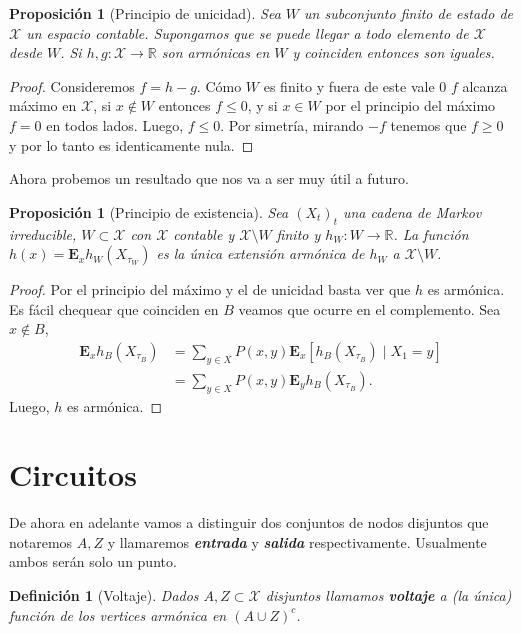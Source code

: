 \documentclass[11pt,a4paper]{article}
\newcommand{\R}{\mathbb{R}}
\newcommand{\E}{\textbf{E}}
\newcommand{\defn}[1]{\textbf{\emph{#1}}}
\numberwithin{equation}{section}
\theoremstyle{LPplain}
\newtheorem{prop}[teo]{Proposición}
\theoremstyle{LPdef}
\newtheorem{defi}[teo]{Definición}
\theoremstyle{LPrem}
\begin{document}
\begin{prop}[Principio de unicidad]
  Sea $W$ un subconjunto finito de estado de $\mathcal{X}$ un espacio contable. Supongamos
  que se puede llegar a todo elemento de $\mathcal{X}$ desde $W$. Si $h, g : \mathcal{X} \to \R$
  son armónicas en $W$ y coinciden entonces son iguales.
\end{prop}

\begin{proof} Consideremos $f = h - g$. Cómo $W$ es finito y fuera de este vale $0$
$f$ alcanza máximo en $\mathcal{X}$, si $x \notin W$ entonces $f \leq 0$, y si $x \in W$
por el principio del máximo $f = 0$ en todos lados. Luego, $f \leq 0$. Por simetría, 
mirando $-f$ tenemos que $f \geq 0$ y por lo tanto es identicamente nula. 
\end{proof}

Ahora probemos un resultado que nos va a ser muy útil a futuro.

\begin{prop}[Principio de existencia]\label{prop:extension}
  Sea $(X_t)_t$ una cadena de Markov irreducible, $W \subset \mathcal{X}$ con $\mathcal{X}$ contable 
  y $\mathcal{X} \setminus W$ finito y $h_{W} \colon W \to \R$. La función $h(x) = \E_x h_W(X_{\tau_W})$ es la única
  extensión armónica de $h_W$ a $\mathcal{X}\setminus W$.  
\end{prop}

\begin{proof}
  Por el principio del máximo y el de unicidad basta ver que $h$ es armónica. Es fácil chequear 
  que coinciden en $B$ veamos que ocurre en el complemento. Sea $x \notin B$,
  \begin{align*}
    \E_x h_B(X_{\tau_B}) &= \sum_{y \in X} P(x, y) \E_x[h_B(X_{\tau_B}) \mid X_1 = y] \\
                         &= \sum_{y \in X} P(x, y) \E_y h_B(X_{\tau_B}). 
  \end{align*}
  Luego, $h$ es armónica.
\end{proof}

\section{Circuitos}

De ahora en adelante vamos a distinguir dos conjuntos de nodos disjuntos que notaremos 
$A, Z$ y llamaremos \defn{entrada} y \defn{salida} respectivamente. Usualmente ambos serán solo un punto.

\begin{defi}[Voltaje]
  Dados $A, Z \subset \mathcal{X}$ disjuntos llamamos \defn{voltaje} a (la única) función de los vertices
  armónica en $(A \cup Z)^{c}$.
\end{defi}
\end{document}
